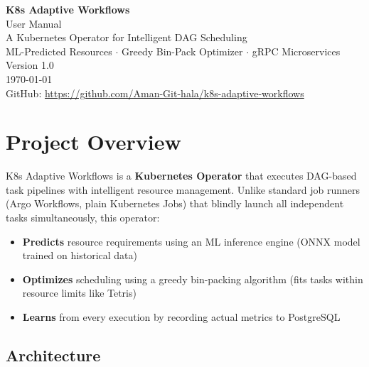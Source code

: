 \documentclass[11pt,a4paper]{article}
\begin{document}
\begin{titlepage}
\centering
\vspace*{3cm}
{\Huge\bfseries\color{accent} K8s Adaptive Workflows}\\[0.5cm]
{\LARGE User Manual}\\[1.5cm]
{\large A Kubernetes Operator for Intelligent DAG Scheduling}\\[0.5cm]
{\large ML-Predicted Resources $\cdot$ Greedy Bin-Pack Optimizer $\cdot$ gRPC Microservices}\\[3cm]
{\large Version 1.0}\\[0.5cm]
{\large\today}\\[2cm]
{\normalsize GitHub: \url{https://github.com/Aman-Git-hala/k8s-adaptive-workflows}}
\vfill
\end{titlepage}

\tableofcontents
\newpage

\section{Project Overview}

K8s Adaptive Workflows is a \textbf{Kubernetes Operator} that executes DAG-based task pipelines with intelligent resource management. Unlike standard job runners (Argo Workflows, plain Kubernetes Jobs) that blindly launch all independent tasks simultaneously, this operator:

\begin{itemize}[leftmargin=2em]
  \item \textbf{Predicts} resource requirements using an ML inference engine (ONNX model trained on historical data)
  \item \textbf{Optimizes} scheduling using a greedy bin-packing algorithm (fits tasks within resource limits like Tetris)
  \item \textbf{Learns} from every execution by recording actual metrics to PostgreSQL
\end{itemize}

\subsection{Architecture}
\end{document}
